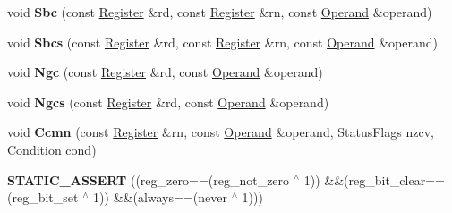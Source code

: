 \begin{DoxyCompactItemize}
\item 
\mbox{\label{classv8_1_1internal_1_1MacroAssembler_a4dc0d2ac884f1bffe5dfb430912e2a16}} 
void {\bfseries Sbc} (const \mbox{\hyperlink{classv8_1_1internal_1_1Register}{Register}} \&rd, const \mbox{\hyperlink{classv8_1_1internal_1_1Register}{Register}} \&rn, const \mbox{\hyperlink{classv8_1_1internal_1_1Operand}{Operand}} \&operand)
\item 
\mbox{\label{classv8_1_1internal_1_1MacroAssembler_a721f2cf4733152e5fb647da02f6cc275}} 
void {\bfseries Sbcs} (const \mbox{\hyperlink{classv8_1_1internal_1_1Register}{Register}} \&rd, const \mbox{\hyperlink{classv8_1_1internal_1_1Register}{Register}} \&rn, const \mbox{\hyperlink{classv8_1_1internal_1_1Operand}{Operand}} \&operand)
\item 
\mbox{\label{classv8_1_1internal_1_1MacroAssembler_afc483468e83b7f582831cc1cbf8cf82a}} 
void {\bfseries Ngc} (const \mbox{\hyperlink{classv8_1_1internal_1_1Register}{Register}} \&rd, const \mbox{\hyperlink{classv8_1_1internal_1_1Operand}{Operand}} \&operand)
\item 
\mbox{\label{classv8_1_1internal_1_1MacroAssembler_a36e9a174f849af5275a47aa9b354d699}} 
void {\bfseries Ngcs} (const \mbox{\hyperlink{classv8_1_1internal_1_1Register}{Register}} \&rd, const \mbox{\hyperlink{classv8_1_1internal_1_1Operand}{Operand}} \&operand)
\item 
\mbox{\label{classv8_1_1internal_1_1MacroAssembler_a6556e72f690df074611288548e651d7a}} 
void {\bfseries Ccmn} (const \mbox{\hyperlink{classv8_1_1internal_1_1Register}{Register}} \&rn, const \mbox{\hyperlink{classv8_1_1internal_1_1Operand}{Operand}} \&operand, Status\+Flags nzcv, Condition cond)
\item 
\mbox{\label{classv8_1_1internal_1_1MacroAssembler_a5ecf86beeab5da10f3e450261f041244}} 
{\bfseries S\+T\+A\+T\+I\+C\+\_\+\+A\+S\+S\+E\+RT} ((reg\+\_\+zero==(reg\+\_\+not\+\_\+zero $^\wedge$ 1)) \&\&(reg\+\_\+bit\+\_\+clear==(reg\+\_\+bit\+\_\+set $^\wedge$ 1)) \&\&(always==(never $^\wedge$ 1)))
\item 

\end{DoxyCompactItemize}
